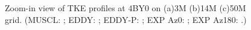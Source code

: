 \begin{figure}[t]
     \caption{Zoom-in view of TKE profiles at 4BY0 on (a)3M (b)14M (c)50M grid. (MUSCL: \mline; EDDY: \eline; EDDY-P: \epline; EXP Az0: \bluediam; EXP Az180: \reddiam.)}
     \label{ztke} 
\end{figure}
